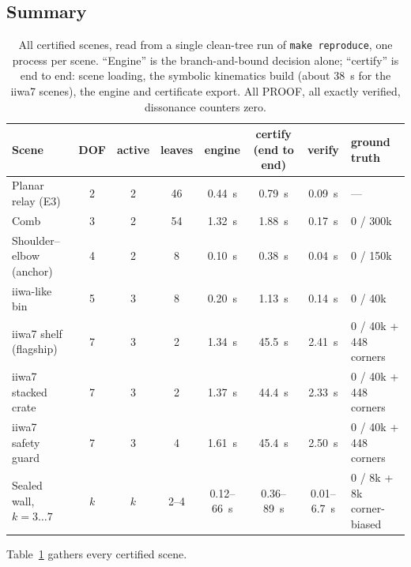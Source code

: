 \documentclass[10pt,twocolumn,letterpaper]{article}
\begin{document}
\subsection{Summary}

\begin{table}[t]
\centering\small
\caption{All certified scenes, read from a single clean-tree run of \texttt{make reproduce}, one process per scene. ``Engine'' is the branch-and-bound decision alone; ``certify'' is end to end: scene loading, the symbolic kinematics build (about 38~s for the iiwa7 scenes), the engine and certificate export. All PROOF, all exactly verified, dissonance counters zero.}
\label{tab:summary}
\begin{tabular}{@{}lccccccl@{}}
\toprule
Scene & DOF & active & leaves & engine & certify (end to end) & verify & ground truth \\
\midrule
Planar relay (E3)        & 2 & 2 & 46  & 0.44~s & 0.79~s  & 0.09~s & --- \\
Comb                     & 3 & 2 & 54  & 1.32~s & 1.88~s  & 0.17~s & 0 / 300k \\
Shoulder--elbow (anchor) & 4 & 2 & 8   & 0.10~s & 0.38~s  & 0.04~s & 0 / 150k \\
iiwa-like bin            & 5 & 3 & 8   & 0.20~s & 1.13~s  & 0.14~s & 0 / 40k \\
iiwa7 shelf (flagship)   & 7 & 3 & 2   & 1.34~s & 45.5~s  & 2.41~s & 0 / 40k + 448 corners \\
iiwa7 stacked crate      & 7 & 3 & 2   & 1.37~s & 44.4~s  & 2.33~s & 0 / 40k + 448 corners \\
iiwa7 safety guard       & 7 & 3 & 4   & 1.61~s & 45.4~s  & 2.50~s & 0 / 40k + 448 corners \\
Sealed wall, $k=3\ldots7$ & $k$ & $k$ & 2--4 & 0.12--66~s & 0.36--89~s & 0.01--6.7~s & 0 / 8k + 8k corner-biased \\
\bottomrule
\end{tabular}
\end{table}

Table~\ref{tab:summary} gathers every certified scene.
\end{document}
